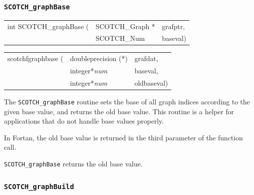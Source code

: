 \subsubsection{{\tt SCOTCH\_graphBase}}

\begin{itemize}
\progsyn

{\tt\begin{tabular}{l@{}ll}
int SCOTCH\_graphBase ( & SCOTCH\_Graph * & grafptr, \\
                        & SCOTCH\_Num     & baseval)
\end{tabular}}

{\tt\begin{tabular}{l@{}ll}
scotchfgraphbase ( & doubleprecision (*) & grafdat, \\
                   & integer*{\it num}   & baseval, \\
                   & integer*{\it num}   & oldbaseval)
\end{tabular}}

\progdes

The {\tt SCOTCH\_graphBase} routine sets the base of all graph indices
according to the given base value, and returns the old base value.
This routine is a helper for applications that do not handle base
values properly.

In Fortan, the old base value is returned in the third parameter of
the function call.

\progret

{\tt SCOTCH\_graphBase} returns the old base value.

\end{itemize}

\subsubsection{{\tt SCOTCH\_graphBuild}}

